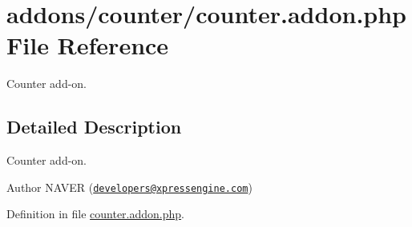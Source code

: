 \hypertarget{counter_8addon_8php}{\section{addons/counter/counter.addon.\+php File Reference}
\label{counter_8addon_8php}
}


Counter add-\/on.  




\subsection{Detailed Description}
Counter add-\/on. 

\begin{DoxyAuthor}{Author}
N\+A\+V\+E\+R (\href{mailto:developers@xpressengine.com}{\tt developers@xpressengine.\+com}) 
\end{DoxyAuthor}


Definition in file \hyperlink{counter_8addon_8php_source}{counter.\+addon.\+php}.

